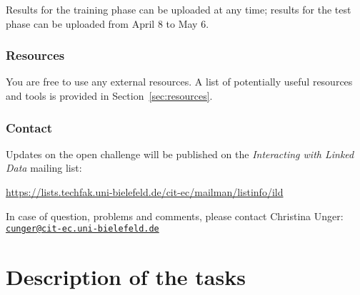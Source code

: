\documentclass[a4paper]{article}
\begin{document}
{Results for the training phase can be uploaded at any time; results for the test phase can be uploaded from April 8 to May 6.

%

\subsubsection*{Resources}

You are free to use any external resources. A list of potentially useful resources and tools is provided in Section~\ref{sec:resources}.

\subsubsection*{Contact}

Updates on the open challenge will be published on the \emph{Interacting with Linked Data} mailing list:
\begin{center}
\url{https://lists.techfak.uni-bielefeld.de/cit-ec/mailman/listinfo/ild}
\end{center}
In case of question, problems and comments, please contact Christina Unger:\\
{\tt \href{mailto::cunger@cit-ec.uni-bielefeld.de?subject=QALD-6}{cunger@cit-ec.uni-bielefeld.de}}

\newpage


\section{Description of the tasks}

}
\end{document}
